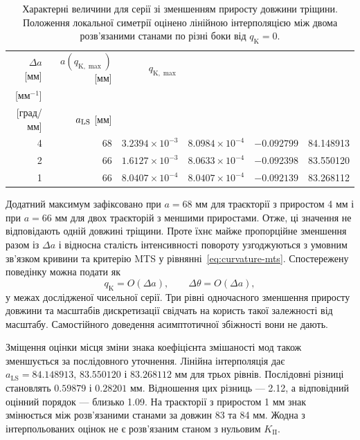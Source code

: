 \documentclass[a4paper,12pt]{article}
\begin{document}
\begin{table}[tbp]
\centering
\small
\setlength{\tabcolsep}{3.6pt}
\caption{Характерні величини для серії зі зменшенням приросту довжини тріщини. Положення локальної
симетрії оцінено лінійною інтерполяцією між двома розв’язаними станами по різні боки від $q_{\mathrm{K}}=0$.}
\label{tab:increment-characteristic}
\begin{tabular}{rrrrrr}
\toprule
$\Delta a$ [мм] & $a(q_{\mathrm{K},\max})$ [мм] & $q_{\mathrm{K},\max}$ &
\shortstack[c]{$q_{\mathrm{K},\max}/\Delta a$\\{}[мм$^{-1}$]} &
\shortstack[c]{$(\Delta\theta/\Delta a)_{q_{\max}}$\\{}[град/мм]} &
$a_{\rm LS}$ [мм]\\
\midrule
4 & 68 & $3.2394\times10^{-3}$ & $8.0984\times10^{-4}$ &
$-0.092799$ & 84.148913\\
2 & 66 & $1.6127\times10^{-3}$ & $8.0633\times10^{-4}$ &
$-0.092398$ & 83.550120\\
1 & 66 & $8.0407\times10^{-4}$ & $8.0407\times10^{-4}$ &
$-0.092139$ & 83.268112\\
\bottomrule
\end{tabular}
\end{table}

Додатний максимум зафіксовано при $a=68$ мм для траєкторії з приростом 4 мм і при $a=66$ мм для двох
траєкторій з меншими приростами. Отже, ці значення не відповідають одній довжині тріщини. Проте
їхнє майже пропорційне зменшення разом із $\Delta a$ і відносна сталість інтенсивності повороту
узгоджуються з умовним зв’язком кривини та критерію MTS у рівнянні~\eqref{eq:curvature-mts}. Спостережену поведінку
можна подати як
\begin{equation}
 q_{\mathrm{K}}=O(\Delta a),\qquad
 \Delta\theta=O(\Delta a),
 \label{eq:increment-scaling}
\end{equation}
у межах дослідженої чисельної серії. Три рівні одночасного зменшення приросту довжини та масштабів дискретизації свідчать на користь такої
залежності від масштабу. Самостійного доведення асимптотичної збіжності вони не дають.

Зміщення оцінки місця зміни знака коефіцієнта змішаності мод також зменшується за послідовного
уточнення. Лінійна інтерполяція дає $a_{\mathrm{LS}}=84.148913$, $83.550120$ і $83.268112$ мм для трьох рівнів. Послідовні різниці
становлять $0.59879$ і $0.28201$ мм. Відношення цих різниць — 2.12, а відповідний оцінний порядок — близько 1.09.
На траєкторії з приростом 1 мм знак змінюється між розв’язаними станами за довжин 83 та 84 мм.
Жодна з інтерпольованих оцінок не є розв’язаним станом з нульовим $K_{\mathrm{II}}$.
\end{document}
